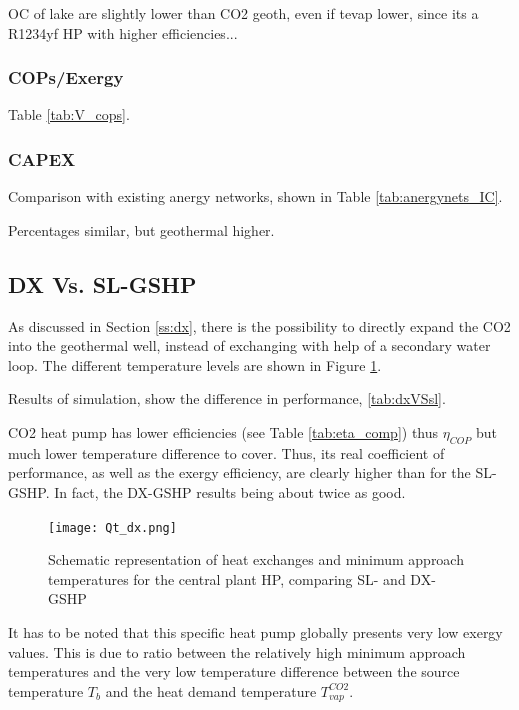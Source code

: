 \documentclass{article}
\begin{document}
OC of lake are slightly lower than CO2 geoth, even if tevap lower, since its a R1234yf HP with higher efficiencies... \\




\subsubsection{COPs/Exergy}
Table \ref{tab:V_cops}.



\subsubsection{CAPEX}
Comparison with existing anergy networks, shown in Table \ref{tab:anergynets_IC}.


Percentages similar, but geothermal higher. 


\subsection{DX Vs. SL-GSHP}
As discussed in Section \ref{ss:dx}, there is the possibility to directly expand the CO2 into the geothermal well, instead of exchanging with help of a secondary water loop. The different temperature levels are shown in Figure \ref{fig:Qt_dx}. 

Results of simulation, show the difference in performance, \ref{tab:dxVSsl}.



CO2 heat pump has lower efficiencies (see Table \ref{tab:eta_comp}) thus $\eta_{COP}$ but much lower temperature difference to cover. Thus, its real coefficient of performance, as well as the exergy efficiency, are clearly higher than for the SL-GSHP. In fact, the DX-GSHP results being about twice as good.

\begin{figure}[htp]
	\centering
	\texttt{[image: Qt\_dx.png]}
	\caption{Schematic representation of heat exchanges and minimum approach temperatures for the central plant HP, comparing SL- and DX-GSHP}
	\label{fig:Qt_dx}
\end{figure}

It has to be noted that this specific heat pump globally presents very low  exergy values. This is due to ratio between the relatively high minimum approach temperatures and the very low temperature difference between the source temperature $T_{b}$ and the heat demand temperature $T_{vap}^{CO2}$.
\end{document}
